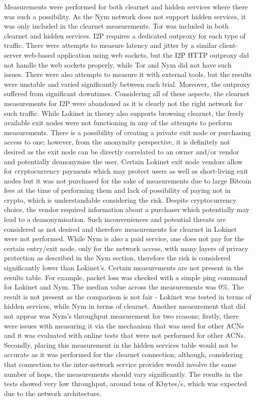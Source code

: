 Measurements were performed for both clearnet and hidden services where there was such a possibility. As the Nym network does not support hidden services, it was only included in the clearnet measurements. Tor was included in both clearnet and hidden services. I2P requires a dedicated outproxy for each type of traffic. There were attempts to measure latency and jitter by a similar client-server web-based application using web sockets, but the I2P HTTP outproxy did not handle the web sockets properly, while Tor and Nym did not have such issues. There were also attempts to measure it with external tools, but the results were unstable and varied significantly between each trial. Moreover, the outproxy suffered from significant downtimes. Considering all of these aspects, the clearnet measurements for I2P were abandoned as it is clearly not the right network for such traffic. While Lokinet in theory also supports browsing clearnet, the freely available exit nodes were not functioning in any of the attempts to perform measurements. There is a possibility of creating a private exit node or purchasing access to one; however, from the anonymity perspective, it is definitely not desired as the exit node can be directly correlated to an owner and/or vendor and potentially deanonymise the user. Certain Lokinet exit node vendors allow for cryptocurrency payments which may protect users as well as short-living exit nodes but it was not purchased for the sake of measurements due to large Bitcoin fees at the time of performing them and lack of possibility of paying not in crypto, which is understandable considering the risk. Despite cryptocurrency choice, the vendor required information about a purchaser which potentially may lead to a deanonymisation. Such inconveniences and potential threats are considered as not desired and therefore measurements for clearnet in Lokinet were not performed. 
While Nym is also a paid service, one does not pay for the certain entry/exit node, only for the network access, with many layers of privacy protection as described in the Nym section, therefore the risk is considered significantly lower than Lokinet’s.
Certain measurements are not present in the results table. For example, packet loss was checked with a simple ping command for Lokinet and Nym. The median value across the measurements was 0\%. The result is not present as the comparison is not fair - Lokinet was tested in terms of hidden services, while Nym in terms of clearnet.
Another measurement that did not appear was Nym's throughput measurement for two reasons; firstly, there were issues with measuring it via the mechanism that was used for other ACNs and it was evaluated with online tests that were not performed for other ACNs. Secondly, placing this measurement in the hidden services table would not be accurate as it was performed for the clearnet connection; although, considering that connection to the inter-network service provider would involve the same number of hops, the measurements should vary significantly. The results in the tests showed very low throughput, around tens of Kbytes/s, which was expected due to the network architecture. 

